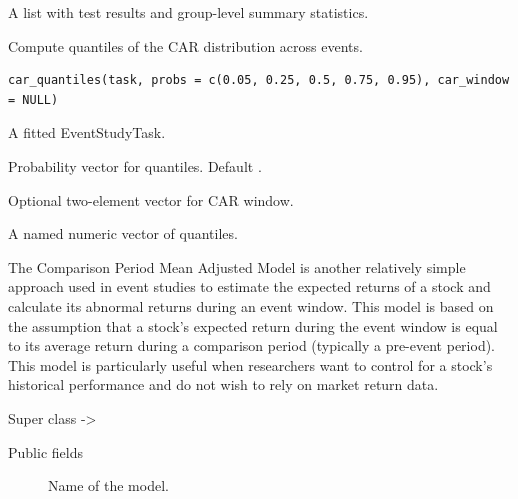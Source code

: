 \documentclass[a4paper]{book}
\begin{document}
%
\begin{Value}
A list with test results and group-level summary statistics.
\end{Value}
%
\begin{Description}
Compute quantiles of the CAR distribution across events.
\end{Description}
%
\begin{Usage}
\begin{verbatim}
car_quantiles(task, probs = c(0.05, 0.25, 0.5, 0.75, 0.95), car_window = NULL)
\end{verbatim}
\end{Usage}
%
\begin{Arguments}
\begin{ldescription}
\item[\code{task}] A fitted EventStudyTask.

\item[\code{probs}] Probability vector for quantiles. Default
.

\item[\code{car\_window}] Optional two-element vector for CAR window.
\end{ldescription}
\end{Arguments}
%
\begin{Value}
A named numeric vector of quantiles.
\end{Value}
%
\begin{Description}
The Comparison Period Mean Adjusted Model is another relatively simple
approach used in event studies to estimate the expected returns of a stock
and calculate its abnormal returns during an event window. This model is
based on the assumption that a stock’s expected return during the event
window is equal to its average return during a comparison period (typically
a pre-event period). This model is particularly useful when researchers want
to control for a stock’s historical performance and do not wish to rely on
market return data.
\end{Description}
%
\begin{Section}{Super class}
 -> 
\end{Section}
%
\begin{Section}{Public fields}

\begin{description}

\item[] Name of the model.

\end{description}


\end{Section}
\end{document}
